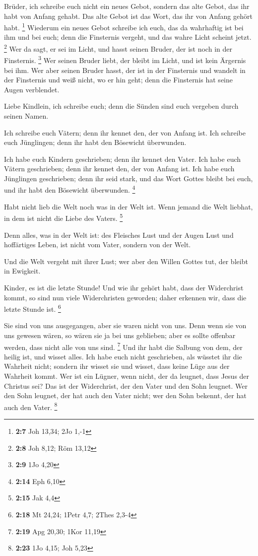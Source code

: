  Brüder, ich schreibe euch nicht ein neues Gebot, sondern
das alte Gebot, das ihr habt von Anfang gehabt. Das alte Gebot ist das
Wort, das ihr von Anfang gehört habt. \footnote{\textbf{2:7} Joh 13,34;
  2Jo 1,-1}  Wiederum ein neues Gebot schreibe ich euch, das
da wahrhaftig ist bei ihm und bei euch; denn die Finsternis vergeht, und
das wahre Licht scheint jetzt. \footnote{\textbf{2:8} Joh 8,12; Röm
  13,12}  Wer da sagt, er sei im Licht, und hasst seinen
Bruder, der ist noch in der Finsternis. \footnote{\textbf{2:9} 1Jo 4,20}
 Wer seinen Bruder liebt, der bleibt im Licht, und ist kein
Ärgernis bei ihm.  Wer aber seinen Bruder hasst, der ist in
der Finsternis und wandelt in der Finsternis und weiß nicht, wo er hin
geht; denn die Finsternis hat seine Augen verblendet.

 Liebe Kindlein, ich schreibe euch; denn die Sünden sind
euch vergeben durch seinen Namen.

 Ich schreibe euch Vätern; denn ihr kennet den, der von
Anfang ist. Ich schreibe euch Jünglingen; denn ihr habt den Bösewicht
überwunden.

 Ich habe euch Kindern geschrieben; denn ihr kennet den
Vater. Ich habe euch Vätern geschrieben; denn ihr kennet den, der von
Anfang ist. Ich habe euch Jünglingen geschrieben; denn ihr seid stark,
und das Wort Gottes bleibt bei euch, und ihr habt den Bösewicht
überwunden. \footnote{\textbf{2:14} Eph 6,10}

 Habt nicht lieb die Welt noch was in der Welt ist. Wenn
jemand die Welt liebhat, in dem ist nicht die Liebe des Vaters.
\footnote{\textbf{2:15} Jak 4,4}

 Denn alles, was in der Welt ist: des Fleisches Lust und
der Augen Lust und hoffärtiges Leben, ist nicht vom Vater, sondern von
der Welt.

 Und die Welt vergeht mit ihrer Lust; wer aber den Willen
Gottes tut, der bleibt in Ewigkeit.

 Kinder, es ist die letzte Stunde! Und wie ihr gehört habt,
dass der Widerchrist kommt, so sind nun viele Widerchristen geworden;
daher erkennen wir, dass die letzte Stunde ist. \footnote{\textbf{2:18}
  Mt 24,24; 1Petr 4,7; 2Thes 2,3-4}

 Sie sind von uns ausgegangen, aber sie waren nicht von
uns. Denn wenn sie von uns gewesen wären, so wären sie ja bei uns
geblieben; aber es sollte offenbar werden, dass nicht alle von uns sind.
\footnote{\textbf{2:19} Apg 20,30; 1Kor 11,19}  Und ihr
habt die Salbung von dem, der heilig ist, und wisset alles.
 Ich habe euch nicht geschrieben, als wüsstet ihr die
Wahrheit nicht; sondern ihr wisset sie und wisset, dass keine Lüge aus
der Wahrheit kommt.  Wer ist ein Lügner, wenn nicht, der da
leugnet, dass Jesus der Christus sei? Das ist der Widerchrist, der den
Vater und den Sohn leugnet.  Wer den Sohn leugnet, der hat
auch den Vater nicht; wer den Sohn bekennt, der hat auch den Vater.
\footnote{\textbf{2:23} 1Jo 4,15; Joh 5,23}

